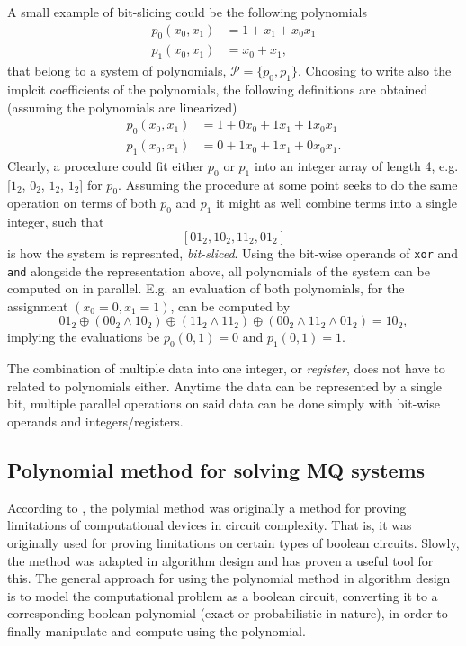A small example of bit-slicing could be the following polynomials
\begin{equation*}
    \begin{split}
        p_0(x_0, x_1) &= 1 + x_1 + x_0x_1\\
        p_1(x_0, x_1) &= x_0 + x_1,
    \end{split}
\end{equation*} 
that belong to a system of polynomials, $\mathcal{P} = \{p_0, p_1\}$. Choosing to write also the implcit coefficients of the polynomials, the following definitions are obtained (assuming the polynomials are linearized)
\begin{equation*}
    \begin{split}
        p_0(x_0, x_1) &= 1 + 0x_0 + 1x_1 + 1x_0x_1\\
        p_1(x_0, x_1) &= 0 + 1x_0 + 1x_1 + 0x_0x_1.
    \end{split}
\end{equation*} 
Clearly, a procedure could fit either $p_0$ or $p_1$ into an integer array of length 4, e.g. [$1_2$, $0_2$, $1_2$, $1_2$] for $p_0$. Assuming the procedure at some point seeks to do the same operation on terms of both $p_0$ and $p_1$ it might as well combine terms into a single integer, such that 
$$
    [01_2, 10_2, 11_2, 01_2]
$$
is how the system is represnted, \textit{bit-sliced}. Using the bit-wise operands of \texttt{xor} and \texttt{and} alongside the representation above, all polynomials of the system can be computed on in parallel. E.g. an evaluation of both polynomials, for the assignment $(x_0 = 0, x_1 = 1)$, can be computed by
\begin{equation*}
                01_2 \oplus (00_2 \wedge 10_2) \oplus (11_2 \wedge 11_2) \oplus (00_2 \wedge 11_2 \wedge 01_2) = 10_2,
\end{equation*}
implying the evaluations be $p_0(0,1) = 0$ and $p_1(0,1) = 1$.

The combination of multiple data into one integer, or \textit{register}, does not have to related to polynomials either. Anytime the data can be represented by a single bit, multiple parallel operations on said data can be done simply with bit-wise operands and integers/registers.

\subsection{Polynomial method for solving MQ systems} \label{sec:prereq:polymethod}
According to \cite{Williams2014ThePM}, the polymial method was originally a method for proving limitations of computational devices in circuit complexity. That is, it was originally used for proving limitations on certain types of boolean circuits. Slowly, the method was adapted in algorithm design and has proven a useful tool for this. The general approach for using the polynomial method in algorithm design is to model the computational problem as a boolean circuit, converting it to a corresponding boolean polynomial (exact or probabilistic in nature), in order to finally manipulate and compute using the polynomial. 

